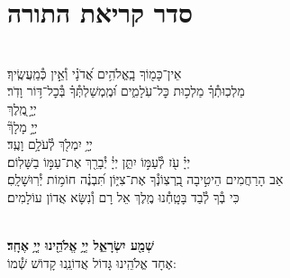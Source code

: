 \documentclass[twoside, openany, parskip=half, 11pt]{book}
\begin{document}
\nextpage

\section[סדר קריאת התורה]{ סדר קריאת התורה }


\\
אֵין־כָּמ֖וֹךָ בָֽאֱלֹהִ֥ים אֲ֝דֹנָ֗י וְ֯אֵ֣ין כְּ֯מַֽעֲשֶֽׂיךָ׃
\\
מַלְכֽוּתְ֯ךָ֗ מַלְכ֥וּת כׇּל־עֹֽלָמִ֑ים וּ֝מֶֽמְשַׁלְתְּ֯ךָ֗ בְּ֯כׇל־דּ֥וֹר וָדֹֽר׃
\\
יְיָ֣ ֖מֶֽלֶךְ
\\
יְיָ֣ מָלָךְ֘
\\
יְיָ֥ יִמְלֹ֖ךְ לְ֯עֹלָ֥ם וָעֶֽד׃
\\
יְיָ֗ עֹ֖ז לְ֯עַמּ֣וֹ יִתֵּ֑ן יְיָ֓ יְ֯בָרֵ֖ךְ אֶת־עַמּ֣וֹ בַשָּׁלֽוֹם׃
\\
אַב הָרַחֲמִים הֵיטִ֣יבָה בִֽ֭רְצֽוֹנְ֯ךָ אֶת־צִיּ֑וֹן תִּ֝בְנֶ֗ה חוֹמ֥וֹת יְ֯רֽוּשָׁלָֽםִ׃
\\
כִּי בְ֯ךָ לְ֯בַד בָּטָֽחְ֯נוּ מֶֽלֶךְ אֵל רָם וְ֯נִשָּׂא אֲדוֹן עוֹלָמִים׃


\\

\textbf{שְׁמַ֖ע יִשְׂרָאֵ֑ל יְיָ֥ אֱלֹהֵ֖ינוּ יְיָ֥ אֶחָֽד׃}\\

אֶחָד אֱלֹהֵֽינוּ גָּדוֹל אֲדוֹנֵֽנוּ קָדוֹשׁ שְׁ֯מוֹ:


\pesicha
\end{document}
